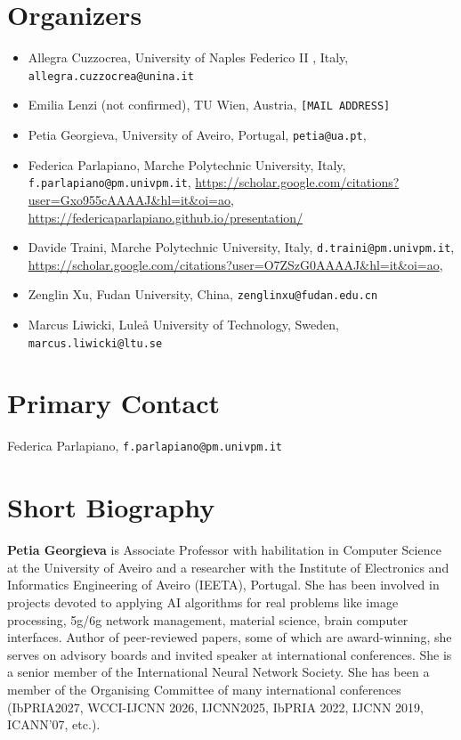 \documentclass{article}
\begin{document}
\section*{Organizers}
\noindent
\begin{itemize}
    \item Allegra Cuzzocrea, University of Naples Federico II , Italy, \texttt{allegra.cuzzocrea@unina.it}
    \item Emilia Lenzi (not confirmed), TU Wien, Austria, \texttt{[MAIL ADDRESS]}
    \item Petia Georgieva, University of Aveiro, Portugal, \texttt{petia@ua.pt}, %
    \item Federica Parlapiano, Marche Polytechnic University, Italy, \texttt{f.parlapiano@pm.univpm.it}, \url{https://scholar.google.com/citations?user=Gxo955cAAAAJ&hl=it&oi=ao}, \url{https://federicaparlapiano.github.io/presentation/}
    \item Davide Traini, Marche Polytechnic University, Italy, \texttt{d.traini@pm.univpm.it}, \url{https://scholar.google.com/citations?user=O7ZSzG0AAAAJ&hl=it&oi=ao}, 
    \item Zenglin Xu, Fudan University, China, \texttt{zenglinxu@fudan.edu.cn}
    \item Marcus Liwicki, Luleå University of Technology, Sweden, \texttt{marcus.liwicki@ltu.se}

\end{itemize}

\section*{Primary Contact}
\noindent
Federica Parlapiano, \texttt{f.parlapiano@pm.univpm.it}

\section*{Short Biography}
\noindent

\smallskip
\noindent
\textbf{Petia Georgieva} is Associate Professor with habilitation in Computer Science at the University of Aveiro and a researcher with the Institute of Electronics and Informatics Engineering of Aveiro (IEETA), Portugal. She has been involved in projects devoted to applying AI algorithms for real problems like image processing, 5g/6g network management, material science, brain computer interfaces. Author of peer-reviewed papers, some of which are award-winning, she serves on advisory boards and invited speaker at international conferences. She is a senior member of the International Neural Network Society. She has been a member of the Organising Committee of many international conferences (IbPRIA2027, WCCI-IJCNN 2026, IJCNN2025, IbPRIA 2022, IJCNN 2019, ICANN’07, etc.).
\end{document}
